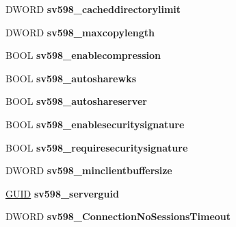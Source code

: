 \begin{DoxyCompactItemize}
D\+W\+O\+RD {\bfseries sv598\+\_\+cacheddirectorylimit}
\item 
\mbox{\label{struct___s_e_r_v_e_r___i_n_f_o__598_ac0ef2b4456464b75aedba2fa279c1b1f}} 
D\+W\+O\+RD {\bfseries sv598\+\_\+maxcopylength}
\item 
\mbox{\label{struct___s_e_r_v_e_r___i_n_f_o__598_a8bf6489bcbc0fc7eda7f2ead7bab9269}} 
B\+O\+OL {\bfseries sv598\+\_\+enablecompression}
\item 
\mbox{\label{struct___s_e_r_v_e_r___i_n_f_o__598_a51d33ff18a66d535eca2d3f82cd69fb6}} 
B\+O\+OL {\bfseries sv598\+\_\+autosharewks}
\item 
\mbox{\label{struct___s_e_r_v_e_r___i_n_f_o__598_afeb3d6a1d7c6844337391f2a2ed922aa}} 
B\+O\+OL {\bfseries sv598\+\_\+autoshareserver}
\item 
\mbox{\label{struct___s_e_r_v_e_r___i_n_f_o__598_ad116c7344f38d644b27657690ed2bc73}} 
B\+O\+OL {\bfseries sv598\+\_\+enablesecuritysignature}
\item 
\mbox{\label{struct___s_e_r_v_e_r___i_n_f_o__598_a75321ea033607d1d0f30abecdbcbf2f0}} 
B\+O\+OL {\bfseries sv598\+\_\+requiresecuritysignature}
\item 
\mbox{\label{struct___s_e_r_v_e_r___i_n_f_o__598_a44d5bdd5d49115b992c0b01be6e43298}} 
D\+W\+O\+RD {\bfseries sv598\+\_\+minclientbuffersize}
\item 
\mbox{\label{struct___s_e_r_v_e_r___i_n_f_o__598_ae9c269f913f271e53aaf1057abbdb390}} 
\hyperlink{interface_g_u_i_d}{G\+U\+ID} {\bfseries sv598\+\_\+serverguid}
\item 
\mbox{\label{struct___s_e_r_v_e_r___i_n_f_o__598_afc725b1fd051cc7b160d95bd7bc70b23}} 
D\+W\+O\+RD {\bfseries sv598\+\_\+\+Connection\+No\+Sessions\+Timeout}
\item 
\mbox{\label{struct___s_e_r_v_e_r___i_n_f_o__598_a2f01a1b250cc4d16a9381bafe9019098}} 

\end{DoxyCompactItemize}
